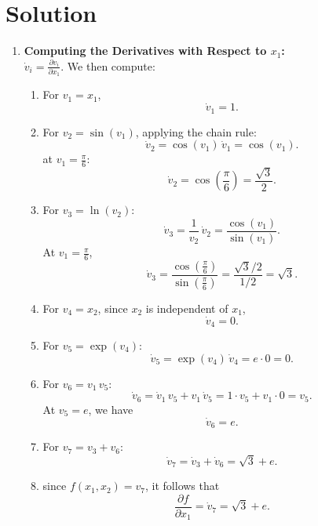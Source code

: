\documentclass[submit]{../harvardml}
\newenvironment{answer}
  {\section*{Solution}}
{}
\begin{document}
\begin{answer}
\begin{enumerate}
\begin{enumerate}
            \item \textbf{Computing the Derivatives with Respect to $x_1$:}\\[1mm]
                   $\dot{v}_i=\frac{\partial v_i}{\partial x_1}$. We then compute:
                  \begin{enumerate}
                    \item For $v_1=x_1$, 
                          \[
                          \dot{v}_1 = 1.
                          \]
                    \item For $v_2=\sin(v_1)$, applying the chain rule:
                          \[
                          \dot{v}_2 = \cos(v_1)\,\dot{v}_1 = \cos(v_1).
                          \]
                           at $v_1=\frac{\pi}{6}$:
                          \[
                          \dot{v}_2 = \cos\left(\frac{\pi}{6}\right)=\frac{\sqrt{3}}{2}.
                          \]
                    \item For $v_3=\ln(v_2)$:
                          \[
                          \dot{v}_3 = \frac{1}{v_2}\,\dot{v}_2 = \frac{\cos(v_1)}{\sin(v_1)}.
                          \]
                          At $v_1=\frac{\pi}{6}$,
                          \[
                          \dot{v}_3 = \frac{\cos(\frac{\pi}{6})}{\sin(\frac{\pi}{6})} = \frac{\sqrt{3}/2}{1/2} = \sqrt{3}.
                          \]
                    \item For $v_4=x_2$, since $x_2$ is independent of $x_1$,
                          \[
                          \dot{v}_4 = 0.
                          \]
                    \item For $v_5=\exp(v_4)$:
                          \[
                          \dot{v}_5 = \exp(v_4)\,\dot{v}_4 = e\cdot 0 = 0.
                          \]
                    \item For $v_6=v_1\,v_5$:
                          \[
                          \dot{v}_6 = \dot{v}_1\,v_5 + v_1\,\dot{v}_5 = 1\cdot v_5 + v_1\cdot 0 = v_5.
                          \]
                          At $v_5 = e$, we have
                          \[
                          \dot{v}_6 = e.
                          \]
                    \item For $v_7=v_3+v_6$:
                          \[
                          \dot{v}_7 = \dot{v}_3 + \dot{v}_6 = \sqrt{3} + e.
                          \]
                    \item since $f(x_1,x_2)=v_7$, it follows that
                          \[
                          \frac{\partial f}{\partial x_1} = \dot{v}_7 = \sqrt{3} + e.
                          \]
                  \end{enumerate}
          \end{enumerate}
  \end{enumerate}
\end{answer}
\end{document}
